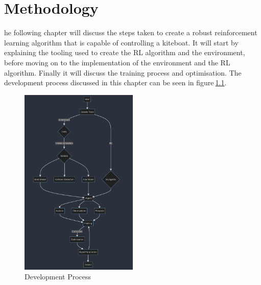 
%
\let\textcircled=\pgftextcircled\chapter{Methodology}

he following chapter will discuss the steps taken to create a robust reinforcement learning algorithm that is capable of controlling a kiteboat. It will start by explaining the tooling used to create the RL algorithm and the environment, before moving on to the implementation of the environment and the RL algorithm. Finally it will discuss the training process and optimisation. The development process discussed in this chapter can be seen in figure$~$\ref{development_process}.

\begin{figure}[h]
    \centering
    \includegraphics[width=0.5\textwidth]{Images/method.png}
    \caption{Development Process}\label{development_process}
\end{figure}

